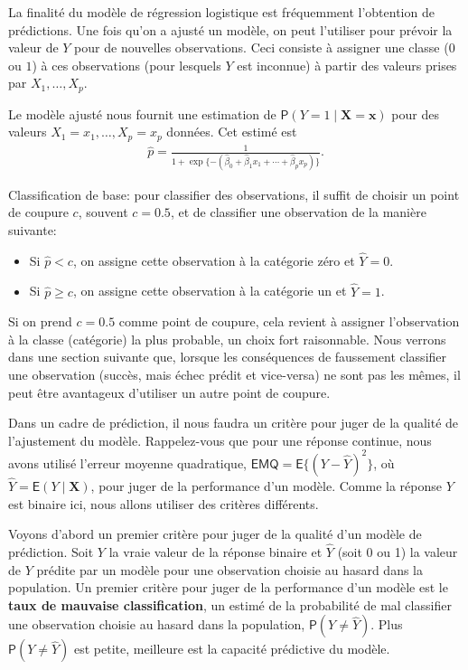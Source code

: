 \documentclass[
  11pt,
  letterpaper,
]{book}
\providecommand{\tightlist}{%
  \setlength{\itemsep}{0pt}\setlength{\parskip}{0pt}}
\theoremstyle{definition}
\theoremstyle{definition}
\theoremstyle{definition}
\theoremstyle{remark}
\begin{document}
La finalité du modèle de régression logistique est fréquemment l'obtention de prédictions. Une fois qu'on a ajusté un modèle, on peut l'utiliser pour prévoir la valeur de \(Y\) pour de nouvelles observations. Ceci consiste à assigner une classe (\(0\) ou \(1\)) à ces observations (pour lesquels \(Y\) est inconnue) à partir des valeurs prises par \(X_1, \ldots, X_p\).

Le modèle ajusté nous fournit une estimation de \({\mathsf P}\left(Y=1 \mid \boldsymbol{X}=\boldsymbol{x}\right)\) pour des valeurs \(X_1=x_1, \ldots, X_p=x_p\) données. Cet estimé est
\begin{align*}
 \widehat{p} = \frac{1}{1+ \exp\{- ( \widehat{\beta}_0 + \widehat{\beta}_1x_1 + \cdots + \widehat{\beta}_p x_p)\}}.
\end{align*}

Classification de base: pour classifier des observations, il suffit de choisir un point de coupure \(c\), souvent \(c=0.5\), et de classifier une observation de la manière suivante:

\begin{itemize}
\tightlist
\item
  Si \(\widehat{p} < c\), on assigne cette observation à la catégorie zéro et \(\widehat{Y}=0\).
\item
  Si \(\widehat{p} \geq c\), on assigne cette observation à la catégorie un et \(\widehat{Y}=1\).
\end{itemize}

Si on prend \(c=0.5\) comme point de coupure, cela revient à assigner l'observation à la classe (catégorie) la plus probable, un choix fort raisonnable. Nous verrons dans une section suivante que, lorsque les conséquences de faussement classifier une observation (succès, mais échec prédit et vice-versa) ne sont pas les mêmes, il peut être avantageux d'utiliser un autre point de coupure.

Dans un cadre de prédiction, il nous faudra un critère pour juger de la qualité de l'ajustement du modèle.
Rappelez-vous que pour une réponse continue, nous avons utilisé l'erreur moyenne quadratique,
\(\mathsf{EMQ} = \mathsf{E}\{(Y-\widehat{Y})^2\}\), où \(\widehat{Y} = \mathsf{E}(Y \mid \mathbf{X})\),
pour juger de la performance d'un modèle. Comme la réponse \(Y\) est binaire ici, nous allons utiliser des critères différents.

Voyons d'abord un premier critère pour juger de la qualité d'un modèle de prédiction. Soit \(Y\) la vraie valeur de la réponse binaire et \(\widehat{Y}\) (soit 0 ou 1) la valeur de \(Y\) prédite par un modèle pour une observation choisie au hasard dans la population. Un premier critère pour juger de la performance d'un modèle est le \textbf{taux de mauvaise classification}, un estimé de la probabilité de mal classifier une observation choisie au hasard dans la population, \({\mathsf P}\left(Y \neq\widehat{Y}\right)\). Plus \({\mathsf P}\left(Y \neq\widehat{Y}\right)\) est petite, meilleure est la capacité prédictive du modèle.
\end{document}
